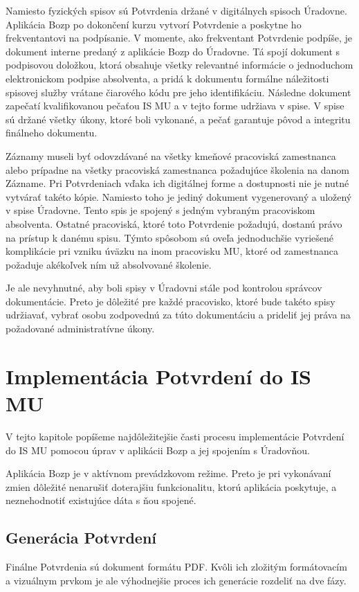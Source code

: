 \documentclass[
  digital,     %
  oneside,     %
  nosansbold,  %
  nocolorbold, %
  lof,         %
  nolot,         %
]{fithesis4}
\begin{document}
Namiesto fyzických spisov sú Potvrdenia držané v digitálnych spisoch Úradovne. Aplikácia Bozp po dokončení kurzu vytvorí Potvrdenie a poskytne ho frekventantovi na podpísanie. V momente, ako frekventant Potvrdenie podpíše, je dokument interne predaný z aplikácie Bozp do Úradovne. Tá spojí dokument s podpisovou doložkou, ktorá obsahuje všetky relevantné informácie o jednoduchom elektronickom podpise absolventa, a pridá k dokumentu formálne náležitosti spisovej služby vrátane čiarového kódu pre jeho identifikáciu. Následne dokument zapečatí kvalifikovanou pečaťou IS MU a v tejto forme udržiava v spise. V spise sú držané všetky úkony, ktoré boli vykonané, a pečať garantuje pôvod a integritu finálneho dokumentu.

Záznamy museli byť odovzdávané na všetky kmeňové pracoviská zamestnanca alebo prípadne na všetky pracoviská zamestnanca požadujúce školenia na danom Zázname. Pri Potvrdeniach vďaka ich digitálnej forme a dostupnosti nie je nutné vytvárať takéto kópie. Namiesto toho je jediný dokument vygenerovaný a uložený v spise Úradovne. Tento spis je spojený s jedným vybraným pracoviskom absolventa. Ostatné pracoviská, ktoré toto Potvrdenie požadujú, dostanú právo na prístup k danému spisu. Týmto spôsobom sú oveľa jednoduchšie vyriešené komplikácie pri vzniku úväzku na inom pracovisku MU, ktoré od zamestnanca požaduje akékoľvek ním už absolvované školenie.

Je ale nevyhnutné, aby boli spisy v Úradovni stále pod kontrolou správcov dokumentácie. Preto je dôležité pre každé pracovisko, ktoré bude takéto spisy udržiavať, vybrať osobu zodpovednú za túto dokumentáciu a prideliť jej práva na požadované administratívne úkony.

\chapter{Implementácia Potvrdení do IS MU}
\label{kap-7}
V tejto kapitole popíšeme najdôležitejšie časti procesu implementácie Potvrdení do IS MU pomocou úprav v aplikácii Bozp a jej spojením s Úradovňou.

Aplikácia Bozp je v aktívnom prevádzkovom režime. Preto je pri vykonávaní zmien dôležité nenarušiť doterajšiu funkcionalitu, ktorú aplikácia poskytuje, a neznehodnotiť existujúce dáta s ňou spojené.

\section{Generácia Potvrdení}
Finálne Potvrdenia sú dokument formátu PDF. Kvôli ich zložitým formátovacím a vizuálnym prvkom je ale výhodnejšie proces ich generácie rozdeliť na dve fázy.
\end{document}
